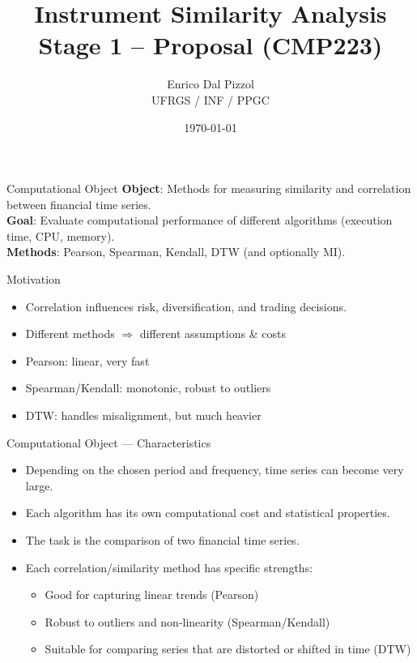 \documentclass[10pt]{beamer}
\title{Instrument Similarity Analysis\\Stage 1 -- Proposal (CMP223)}
\author{Enrico Dal Pizzol \\ UFRGS / INF / PPGC}
\date{\today}
\begin{document}
\maketitle

\begin{frame}{Computational Object}
\textbf{Object}: Methods for measuring similarity and correlation between financial time series. \\[0.3cm]

\textbf{Goal}: Evaluate computational performance of different algorithms (execution time, CPU, memory). \\[0.3cm]

\textbf{Methods}: Pearson, Spearman, Kendall, DTW (and optionally MI).
\end{frame}

\begin{frame}{Motivation}
\begin{itemize}
  \item Correlation influences risk, diversification, and trading decisions.
  \item Different methods $\Rightarrow$ different assumptions \& costs
  \item Pearson: linear, very fast
  \item Spearman/Kendall: monotonic, robust to outliers
  \item DTW: handles misalignment, but much heavier
\end{itemize}
\end{frame}


\begin{frame}{Computational Object --- Characteristics}
\begin{itemize}
  \item Depending on the chosen period and frequency, time series can become very large.
  \item Each algorithm has its own computational cost and statistical properties.
  \item The task is the comparison of two financial time series.
  \item Each correlation/similarity method has specific strengths:
    \begin{itemize}
      \item Good for capturing linear trends (Pearson)
      \item Robust to outliers and non-linearity (Spearman/Kendall)
      \item Suitable for comparing series that are distorted or shifted in time (DTW)
    \end{itemize}
\end{itemize}
\end{frame}
\end{document}
